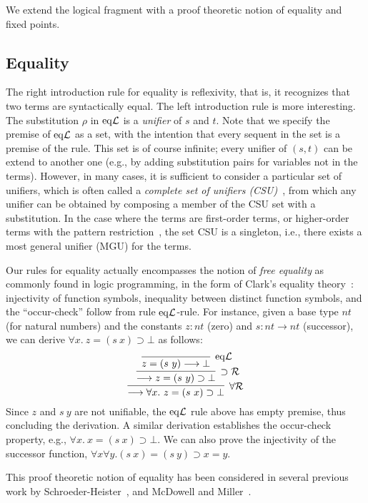 \documentclass[preprint]{elsarticle}
\newcommand{\Seq}[2]{#1\longrightarrow #2}
\newcommand{\eqL}{{\rm eq}{\cal L}}
\newcommand{\forallR}{\forall{\cal R}}
\newcommand{\oimpR}{\oimp{\cal R}}
\newcommand{\oimp}{\supset}
\begin{document}
We extend the logical fragment with a proof theoretic notion of
equality and fixed points.


\subsection{Equality}
\label{ssec:eq}
The right introduction rule for equality is reflexivity, that is,
it recognizes that two terms are syntactically equal.
The left introduction rule is more interesting.  The substitution
$\rho$ in $\eqL$ is a \emph{unifier} of $s$ and $t$. Note that we
specify the premise of $\eqL$ as a set, with the intention that every
sequent in the set is a premise of the rule.  This set is of course
infinite; every unifier of $(s,t)$ can be extend to another one (e.g.,
by adding substitution pairs for variables not in the terms).
However, in many cases, it is sufficient to consider a particular set
of unifiers, which is often called a \emph{complete set of unifiers
  (CSU)}~\cite{BaaderS01}, from which any unifier can be obtained by
composing a member of the CSU set with a substitution.  In the case
where the terms are first-order terms, or higher-order terms with the
pattern restriction~\cite{Miller91elp}, the set CSU is a singleton,
i.e., there exists a most general unifier (MGU) for the terms.





Our rules for equality actually encompasses the notion of \emph{free
  equality} as commonly found in logic programming, in the form of
Clark's equality theory~\cite{clark78}: injectivity of function
symbols, inequality between distinct function symbols, and the
``occur-check'' follow from rule $\eqL$-rule.  For instance, given a
base type $nt$ (for natural numbers) and the constants $z : nt$ (zero)
and $s : nt \rightarrow nt$ (successor), we can derive $\forall x.\ z
= (s~x) \oimp \bot$ as follows:
$$
\infer[\forallR] {\Seq {} {\forall x.\ z = (s~x) \oimp \bot}} {
  \infer[\oimpR] {\Seq{}{z = (s~y) \oimp \bot}} {\infer[\eqL] {\Seq
      {z = (s~y)} {\bot}} {} } }
$$
Since $z$ and $s~y$ are not unifiable, the $\eqL$ rule above has empty
premise, thus concluding the derivation. A similar derivation
establishes the occur-check property, e.g., $\forall x.\ x = (s~x)
\oimp \bot$. We can also prove the injectivity of the successor
function, \ie $\forall x \forall y. (s~x) = (s~y) \oimp x = y$.


This proof theoretic notion of equality has been considered in several
previous work \eg by Schroeder-Heister~\cite{schroeder-heister93lics},
and McDowell and Miller~\cite{mcdowell00tcs}.
\end{document}
